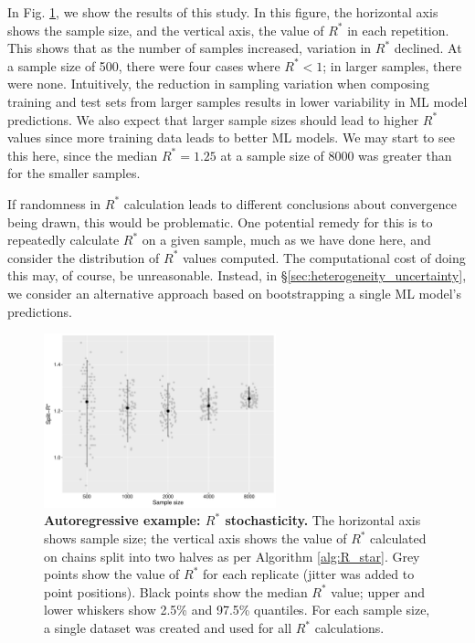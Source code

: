 \documentclass{article}
\begin{document}
In Fig. \ref{fig:ar1_samplesize}, we show the results of this study. In this figure, the horizontal axis shows the sample size, and the vertical axis, the value of $R^*$ in each repetition. This shows that as the number of samples increased, variation in $R^*$ declined. At a sample size of 500, there were four cases where $R^*<1$; in larger samples, there were none. Intuitively, the reduction in sampling variation when composing training and test sets from larger samples results in lower variability in ML model predictions. We also expect that larger sample sizes should lead to higher $R^*$ values since more training data leads to better ML models. We may start to see this here, since the median $R^*=1.25$ at a sample size of 8000 was greater than for the smaller samples. 

If randomness in $R^*$ calculation leads to different conclusions about convergence being drawn, this would be problematic. One potential remedy for this is to repeatedly calculate $R^*$ on a given sample, much as we have done here, and consider the distribution of $R^*$ values computed. The computational cost of doing this may, of course, be unreasonable. Instead, in \S\ref{sec:heterogeneity_uncertainty}, we consider an alternative approach based on bootstrapping a single ML model's predictions.

\begin{figure}[!htb]
	\centerline{\includegraphics[width=0.6\textwidth]{../output/ar1_samplesize.pdf}}
	\caption{\textbf{Autoregressive example: $R^*$ stochasticity.} The horizontal axis shows sample size; the vertical axis shows the value of $R^*$ calculated on chains split into two halves as per Algorithm \ref{alg:R_star}. Grey points show the value of $R^*$ for each replicate (jitter was added to point positions). Black points show the median $R^*$ value; upper and lower whiskers show 2.5\% and 97.5\% quantiles. For each sample size, a single dataset was created and used for all $R^*$ calculations.}
	\label{fig:ar1_samplesize}
\end{figure}
\end{document}
